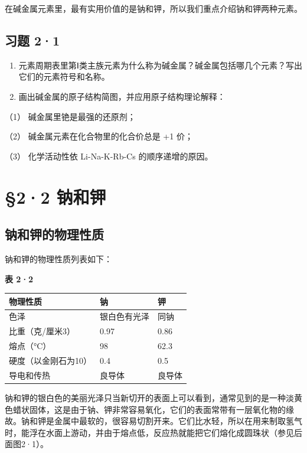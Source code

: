 在碱金属元素里，最有实用价值的是钠和钾，所以我们重点介绍钠和钾两种元素。

\subsection{习题 2·1}

\begin{enumerate}
\item
  元素周期表里第Ⅰ类主族元素为什么称为碱金属？碱金属包括哪几个元素？写出它们的元素符号和名称。
\item
  画出碱金属的原子结构简图，并应用原子结构理论解释：
\end{enumerate}

（1） 碱金属里铯是最强的还原剂；

（2） 碱金属元素在化合物里的化合价总是 +1 价；

（3） 化学活动性依 Li-Na-K-Rb-Cs 的顺序递增的原因。

\section{§2·2 钠和钾}

\subsection{钠和钾的物理性质}

钠和钾的物理性质列表如下：

\textbf{表 2·2}

{\def\LTcaptype{none} %
\begin{longtable}[]{@{}lll@{}}
\toprule\noalign{}
物理性质 & 钠 & 钾 \\
\midrule\noalign{}
\endhead
\bottomrule\noalign{}
\endlastfoot
色泽 & 银白色有光泽 & 同钠 \\
比重（克/厘米3） & 0.97 & 0.86 \\
熔点（°C） & 98 & 62.3 \\
硬度（以金刚石为10） & 0.4 & 0.5 \\
导电和传热 & 良导体 & 良导体 \\
\end{longtable}
}

钠和钾的银白色的美丽光泽只当新切开的表面上可以看到，通常见到的是一种淡黄色蜡状固体，这是由于钠、钾非常容易氧化，它们的表面常带有一层氧化物的缘故。钠和钾是金属中最软的，很容易切割开来。它们比水轻，所以在用来制取氢气时，能浮在水面上游动，并由于熔点低，反应热就能把它们熔化成圆珠状（参见后面图2·1）。


